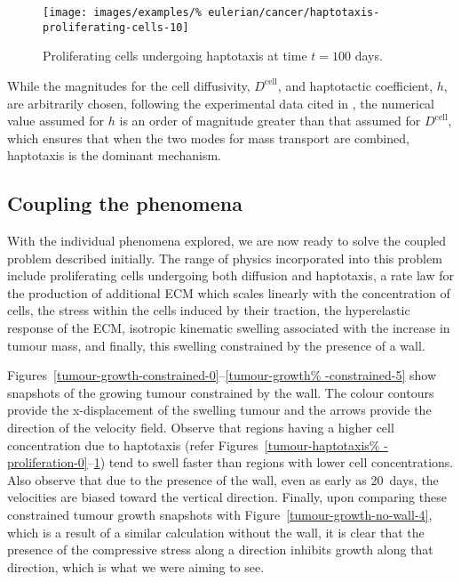 \begin{figure}[!hptb]
\centering
\texttt{[image: images/examples/\%
eulerian/cancer/haptotaxis-proliferating-cells-10]}
\caption{Proliferating cells undergoing haptotaxis at time $t=100$
  days.}
\label{tumour-haptotaxis-proliferation-10}
\end{figure}

While the magnitudes for the cell diffusivity, $D^{\mathrm{cell}}$,
and haptotactic coefficient, $h$, are arbitrarily chosen, following
the experimental data cited in \citet{namyetal:04}, the numerical
value assumed for $h$ is an order of magnitude greater than that
assumed for $D^{\mathrm{cell}}$, which ensures that when the two modes
for mass transport are combined, haptotaxis is the dominant mechanism.

\subsection{Coupling the phenomena}
\label{cacophonous-medley}

With the individual phenomena explored, we are now ready to solve
the coupled problem described initially. The range of physics
incorporated into this problem include proliferating cells undergoing
both diffusion and haptotaxis, a rate law for the production of
additional ECM which scales linearly with the concentration of
cells, the stress within the cells induced by their traction, the
hyperelastic response of the ECM, isotropic kinematic swelling
associated with the increase in tumour mass, and finally, this
swelling constrained by the presence of a wall.

Figures~\ref{tumour-growth-constrained-0}--\ref{tumour-growth%
  -constrained-5} show snapshots of the growing tumour constrained by
the wall. The colour contours provide the x-displacement of the
swelling tumour and the arrows provide the direction of the velocity
field. Observe that regions having a higher cell concentration due to
haptotaxis (refer Figures~\ref{tumour-haptotaxis%
  -proliferation-0}--\ref{tumour-haptotaxis-proliferation-10}) tend to
swell faster than regions with lower cell concentrations. Also observe
that due to the presence of the wall, even as early as 20~days, the
velocities are biased toward the vertical direction. Finally, upon
comparing these constrained tumour growth snapshots with
Figure~\ref{tumour-growth-no-wall-4}, which is a result of a similar
calculation without the wall, it is clear that the presence of the
compressive stress along a direction inhibits growth along that
direction, which is what we were aiming to see.

